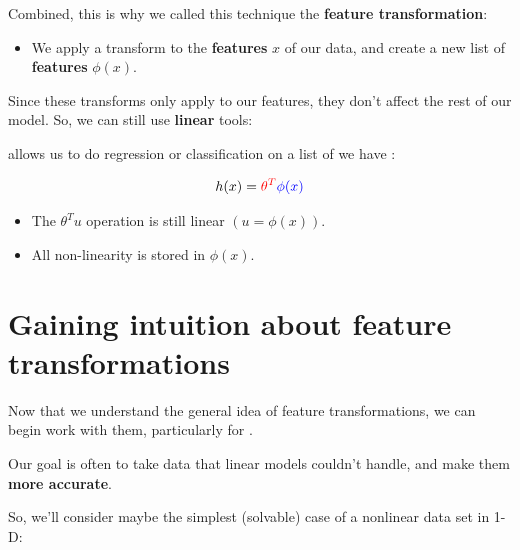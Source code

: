         Combined, this is why we called this technique the \textbf{feature transformation}: 
            \begin{itemize}
                \item We apply a transform to the \textbf{features} $x$ of our data, and create a new list of \textbf{features} $\phi(x)$.
            \end{itemize}

        Since these transforms only apply to our features, they don't affect the rest of our model. So, we can still use \textbf{linear} tools:\\

        \begin{definition}
             allows us to do  regression or classification on a list of  we have  :

            \begin{equation*}
                h(x) = 
            \textcolor{red}{\theta^T} 
            \textcolor{blue}{\phi(x)}
            \end{equation*}

            \begin{itemize}
                \item The $\theta^T u$ operation is still linear $(u=\phi(x))$.
                \item All non-linearity is stored in $\phi(x)$.
            \end{itemize}
        \end{definition}

    \secdiv

    \pagebreak

    \section{Gaining intuition about feature transformations}

        Now that we understand the general idea of feature transformations, we can begin work with them, particularly for .

        Our goal is often to take data that linear models couldn't handle, and make them \textbf{more accurate}.

        So, we'll consider maybe the simplest (solvable) case of a nonlinear data set in 1-D:

